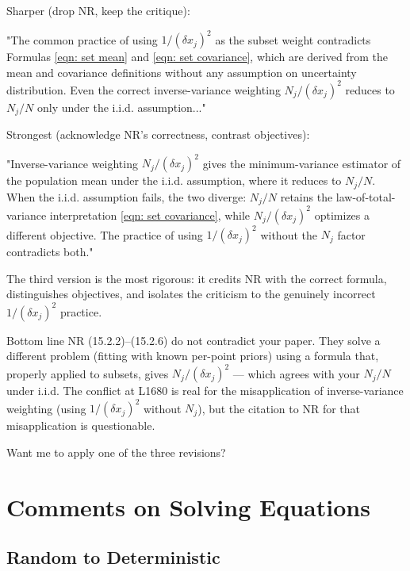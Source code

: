 \documentclass[twoside]{article}
\numberwithin{equation}{section}
\begin{document}
Sharper (drop NR, keep the critique):

"The common practice of using $1/(\delta x_j)^2$ as the subset weight contradicts Formulas \eqref{eqn: set mean} and \eqref{eqn: set covariance}, which are derived from the mean and covariance definitions without any assumption on uncertainty distribution. Even the correct inverse-variance weighting $N_j/(\delta x_j)^2$ \cite{Numerical_Recipes} reduces to $N_j/N$ only under the i.i.d. assumption..."

Strongest (acknowledge NR's correctness, contrast objectives):

"Inverse-variance weighting $N_j/(\delta x_j)^2$ \cite{Numerical_Recipes} gives the minimum-variance estimator of the population mean under the i.i.d. assumption, where it reduces to $N_j/N$. When the i.i.d. assumption fails, the two diverge: $N_j/N$ retains the law-of-total-variance interpretation \eqref{eqn: set covariance}, while $N_j/(\delta x_j)^2$ optimizes a different objective. The practice of using $1/(\delta x_j)^2$ without the $N_j$ factor contradicts both."

The third version is the most rigorous: it credits NR with the correct formula, distinguishes objectives, and isolates the criticism to the genuinely incorrect $1/(\delta x_j)^2$ practice.

Bottom line
NR (15.2.2)–(15.2.6) do not contradict your paper. They solve a different problem (fitting with known per-point priors) using a formula that, properly applied to subsets, gives $N_j/(\delta x_j)^2$ — which agrees with your $N_j/N$ under i.i.d. The conflict at L1680 is real for the misapplication of inverse-variance weighting (using $1/(\delta x_j)^2$ without $N_j$), but the citation to NR for that misapplication is questionable.

Want me to apply one of the three revisions?



\section{Comments on Solving Equations}
\label{sec: equations}

\subsection{Random to Deterministic}
\end{document}
